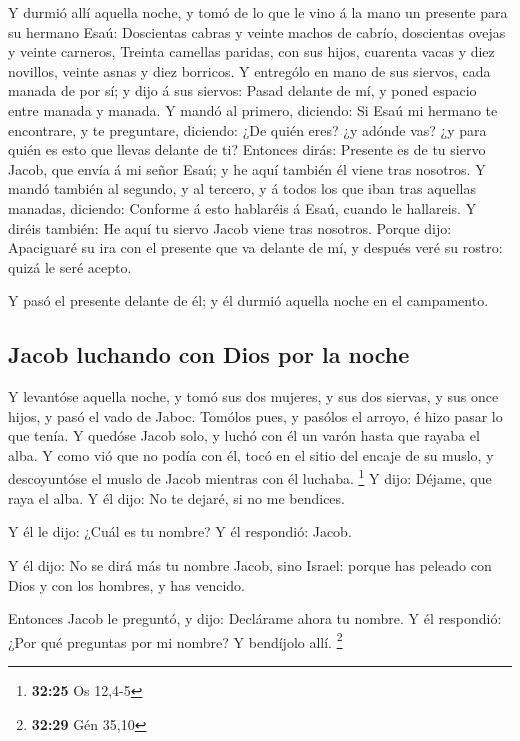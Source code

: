  Y durmió allí aquella noche, y tomó de lo que le vino á la
mano un presente para su hermano Esaú:  Doscientas cabras y
veinte machos de cabrío, doscientas ovejas y veinte carneros,
 Treinta camellas paridas, con sus hijos, cuarenta vacas y
diez novillos, veinte asnas y diez borricos.  Y entrególo
en mano de sus siervos, cada manada de por sí; y dijo á sus siervos:
Pasad delante de mí, y poned espacio entre manada y manada.
 Y mandó al primero, diciendo: Si Esaú mi hermano te
encontrare, y te preguntare, diciendo: ¿De quién eres? ¿y adónde vas? ¿y
para quién es esto que llevas delante de ti?  Entonces
dirás: Presente es de tu siervo Jacob, que envía á mi señor Esaú; y he
aquí también él viene tras nosotros.  Y mandó también al
segundo, y al tercero, y á todos los que iban tras aquellas manadas,
diciendo: Conforme á esto hablaréis á Esaú, cuando le hallareis.
 Y diréis también: He aquí tu siervo Jacob viene tras
nosotros. Porque dijo: Apaciguaré su ira con el presente que va delante
de mí, y después veré su rostro: quizá le seré acepto.

 Y pasó el presente delante de él; y él durmió aquella
noche en el campamento.

\hypertarget{jacob-luchando-con-dios-por-la-noche}{%
\subsection{Jacob luchando con Dios por la
noche}\label{jacob-luchando-con-dios-por-la-noche}}

 Y levantóse aquella noche, y tomó sus dos mujeres, y sus
dos siervas, y sus once hijos, y pasó el vado de Jaboc. 
Tomólos pues, y pasólos el arroyo, é hizo pasar lo que tenía.
 Y quedóse Jacob solo, y luchó con él un varón hasta que
rayaba el alba.  Y como vió que no podía con él, tocó en el
sitio del encaje de su muslo, y descoyuntóse el muslo de Jacob mientras
con él luchaba. \footnote{\textbf{32:25} Os 12,4-5}  Y
dijo: Déjame, que raya el alba. Y él dijo: No te dejaré, si no me
bendices.

 Y él le dijo: ¿Cuál es tu nombre? Y él respondió: Jacob.

 Y él dijo: No se dirá más tu nombre Jacob, sino Israel:
porque has peleado con Dios y con los hombres, y has vencido.

 Entonces Jacob le preguntó, y dijo: Declárame ahora tu
nombre. Y él respondió: ¿Por qué preguntas por mi nombre? Y bendíjolo
allí. \footnote{\textbf{32:29} Gén 35,10}

